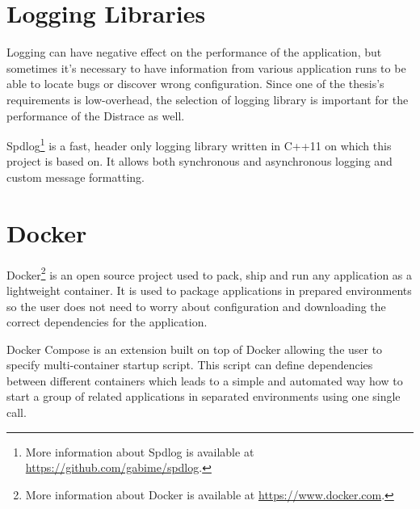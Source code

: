 \section{Logging Libraries}
Logging can have negative effect on the performance of the application, but sometimes it's necessary to have information from various application runs to be able to locate bugs or discover wrong configuration. Since one of the thesis's requirements is low-overhead, the selection of logging library is important for the performance of the Distrace as well. 

Spdlog\footnote{More information about Spdlog is available at \url{https://github.com/gabime/spdlog}.} is a fast, header only logging library written in C++11 on which this project is based on. It allows both synchronous and asynchronous logging and custom message formatting.
\section{Docker}
Docker\footnote{More information about Docker is available at \url{https://www.docker.com}.} is an open source project used to pack, ship and run any application as a lightweight container. It is used to package applications in prepared environments so the user does not need to worry about configuration and downloading the correct dependencies for the application. 

Docker Compose is an extension built on top of Docker allowing the user to specify multi-container startup script. This script can define dependencies between different containers which leads to a simple and automated way how to start a group of related applications in separated environments using one single call. 

